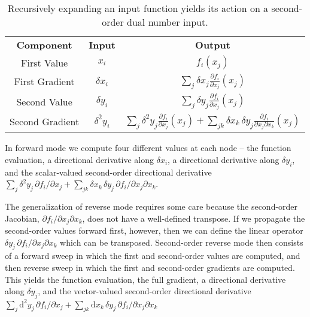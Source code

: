 \documentclass[11pt]{article}
\begin{document}
\begin{table*}[t!]
	\centering
	\renewcommand{\arraystretch}{2}
	\begin{tabular}{ccc}
	\rowcolor[gray]{0.9} \textbf{Component} & \textbf{Input} & \textbf{Output} \\
	First Value & 
	$x_{i}$ & 
	$f_{i} \! \left( x_{j} \right)$ 
	\\
	\rowcolor[gray]{0.9} 
	First Gradient & 
	$\delta x_{i}$ &
	$\displaystyle \sum_{j} \delta x_{j}  \frac{ \partial f_{i} }{ \partial x_{j} } \! \left( x_{j} \right)$
	\\
	Second Value & 
	$\delta y_{i}$ & 
	$\displaystyle \sum_{j} \delta y_{j} \frac{ \partial f_{i} }{ \partial x_{j} } \! \left( x_{j} \right)$
	\\
	\rowcolor[gray]{0.9} 
	Second Gradient & 
	$\delta^{2} y_{i}$ & 
	$\displaystyle \sum_{j} \delta^{2} y_{j} \frac{ \partial f_{i} }{ \partial x_{j} } \! \left( x_{j} \right)
	+ \sum_{jk} \delta x_{k} \, \delta y_{j}
	\frac{ \partial f_{i} }{ \partial x_{j} \partial x_{k} } \! \left( x_{j} \right)$
	\\
	\end{tabular}
	\caption{Recursively expanding an input function yields its action
	on a second-order dual number input.
	\label{tab:secondOrder}}
\end{table*}

In forward mode we compute four different values at each node -- the function
evaluation, a directional derivative along $\delta x_{i}$, a directional derivative
along $\delta y_{i}$, and the scalar-valued second-order directional derivative
$ \sum_{j} \delta^{2} y_{j} \, \partial f_{i} / \partial x_{j}
+ \sum_{jk} \delta x_{k} \, \delta y_{j} \, \partial f_{i} / \partial x_{j} \partial x_{k}$.

The generalization of reverse mode requires some care because the second-order
Jacobian, $\partial f_{i} / \partial x_{j} \partial x_{k}$, does not have a well-defined
transpose.  If we propagate the second-order values forward first, however,
then we can define the linear operator 
$\delta y_{j} \, \partial f_{i} / \partial x_{j} \partial x_{k}$ which can be transposed.
Second-order reverse mode then consists of a forward sweep in which the
first and second-order values are computed, and then reverse sweep in which
the first and second-order gradients are computed.  This yields the function
evaluation, the full gradient, a directional derivative along $\delta y_{j}$, and
the vector-valued second-order directional derivative 
$ \sum_{j} \mathrm{d}^{2} y_{j} \, \partial f_{i} / \partial x_{j}
+ \sum_{jk} \mathrm{d} x_{k} \, \delta y_{j} \, \partial f_{i} / \partial x_{j} \partial x_{k}$
\end{document}
